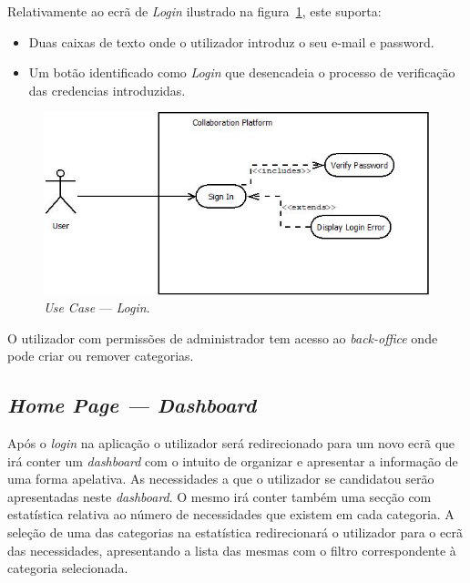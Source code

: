Relativamente ao ecrã de \textit{Login} ilustrado na figura~\ref{fig:uc:login}, este suporta:

\begin{itemize}
    \item Duas caixas de texto onde o utilizador introduz o seu e-mail e password.
    \item Um botão identificado como \textit{Login} que desencadeia o processo de verificação das credencias introduzidas.
\end{itemize}

\begin{figure}[H]
    \centering
    \includegraphics[scale=0.6]{figures/Login Use Case.jpeg}
    \caption{\textit{Use Case} --- \textit{Login}.}\label{fig:uc:login}
\end{figure}

O utilizador com permissões de administrador tem acesso ao \textit{back-office} onde pode criar ou remover categorias.

\subsection{\textit{Home Page --- Dashboard}}\label{subsec:dashboard}

Após o \textit{login} na aplicação o utilizador será redirecionado para um novo ecrã que irá conter um \textit{dashboard} com o intuito de organizar e 
apresentar a informação de uma forma apelativa. As necessidades a que o utilizador se candidatou serão apresentadas neste \textit{dashboard}. 
O mesmo irá conter também uma secção com estatística relativa ao número de necessidades que existem em cada categoria. 
A seleção de uma das categorias na estatística redirecionará o utilizador para o ecrã das necessidades, 
apresentando a lista das mesmas com o filtro correspondente à categoria selecionada. 


